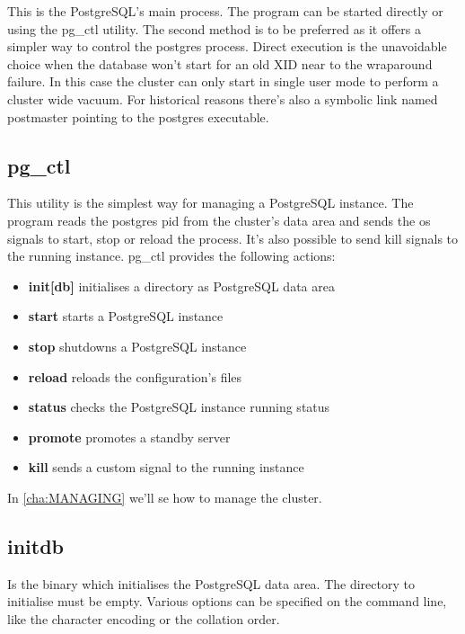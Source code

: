 \label{sec:POSTGRES}

This is the PostgreSQL's main process. The program can be started directly or
using the pg\_ctl utility. The second method is to be preferred as it offers a
simpler way to control the postgres process. Direct execution is the
unavoidable choice when the database won't start for an old XID near to the
wraparound failure. In this case the cluster can
only start in single user mode to perform a cluster wide vacuum. For historical
reasons there's also a symbolic link named postmaster pointing to the postgres
executable.

\subsection{pg\_ctl}

\label{sub:PGCTL}

This utility is the simplest way for managing a PostgreSQL instance. The
program reads the postgres pid from the cluster's data area and sends the os
signals to start, stop or reload the process. It's also possible to send kill
signals to the running instance. pg\_ctl provides the following actions:

\begin{itemize}

    \item \textbf{init[db]} initialises a directory as PostgreSQL data area
    \item \textbf{start} starts a PostgreSQL instance
    \item \textbf{stop} shutdowns a PostgreSQL instance
    \item \textbf{reload} reloads the configuration's files
    \item \textbf{status} checks the PostgreSQL instance running status
    \item \textbf{promote} promotes a standby server
    \item \textbf{kill} sends a custom signal to the running instance

\end{itemize}

In \ref{cha:MANAGING} we'll se how to manage the cluster.

\subsection{initdb}

Is the binary which initialises the PostgreSQL data area. The directory to initialise must
be empty. Various options can be specified on the command line, like the character encoding or the
collation order.


